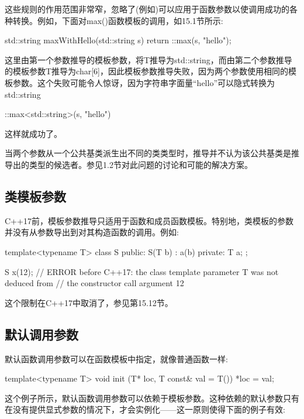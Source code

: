 这些规则的作用范围非常窄，忽略了(例如)可以应用于函数参数以使调用成功的各种转换。例如，下面对max()函数模板的调用，如15.1节所示:

\begin{cpp}
std::string maxWithHello(std::string s)
{
	return ::max(s, "hello");
}
\end{cpp}

这里由第一个参数推导的模板参数，将T推导为std::string，而由第二个参数推导的模板参数T推导为char[6]，因此模板参数推导失败，因为两个参数使用相同的模板参数。这个失败可能令人惊讶，因为字符串字面量“hello”可以隐式转换为std::string

\begin{cpp}
::max<std::string>(s, "hello")
\end{cpp}

这样就成功了。

当两个参数从一个公共基类派生出不同的类类型时，推导并不认为该公共基类是推导出的类型的候选者。参见1.2节对此问题的讨论和可能的解决方案。

\subsection{类模板参数}

C++17前，模板参数推导只适用于函数和成员函数模板。特别地，类模板的参数并没有从参数导出到对其构造函数的调用。例如:

\begin{cpp}
template<typename T>
class S {
	public:
	S(T b) : a(b) {
	}
	private:
	T a;
};

S x(12); // ERROR before C++17: the class template parameter T was not deduced from
// the constructor call argument 12
\end{cpp}

这个限制在C++17中取消了，参见第15.12节。

\subsection{默认调用参数}

默认函数调用参数可以在函数模板中指定，就像普通函数一样:

\begin{cpp}
template<typename T>
void init (T* loc, T const& val = T())
{
	*loc = val;
}
\end{cpp}

这个例子所示，默认函数调用参数可以依赖于模板参数。这种依赖的默认参数只有在没有提供显式参数的情况下，才会实例化——这一原则使得下面的例子有效:

